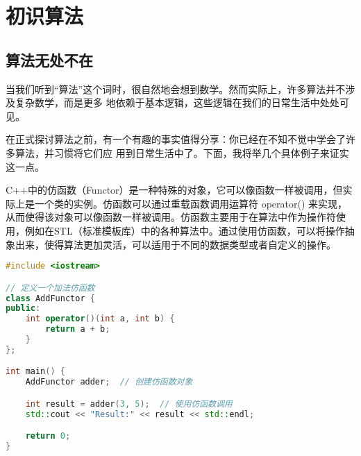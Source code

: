 
\pagestyle{fancy}
\rhead{}
\lhead{}
\lfoot{}
\cfoot{-\ \thepage \  -}
\rfoot{}
\section{初识算法}
\subsection{ 算法无处不在}
当我们听到“算法”这个词时，很自然地会想到数学。然而实际上，许多算法并不涉及复杂数学，而是更多
地依赖于基本逻辑，这些逻辑在我们的日常生活中处处可见。
\par 在正式探讨算法之前，有一个有趣的事实值得分享：你已经在不知不觉中学会了许多算法，并习惯将它们应
用到日常生活中了。下面，我将举几个具体例子来证实这一点。
\begin{formal}
C++中的仿函数（Functor）是一种特殊的对象，它可以像函数一样被调用，但实际上是一个类的实例。仿函数可以通过重载函数调用运算符 operator() 来实现，从而使得该对象可以像函数一样被调用。仿函数主要用于在算法中作为操作符使用，例如在STL（标准模板库）中的各种算法中。通过使用仿函数，可以将操作抽象出来，使得算法更加灵活，可以适用于不同的数据类型或者自定义的操作。
\end{formal}
\begin{lstlisting}[language=C++, label=lst:cpp]
#include <iostream>

// 定义一个加法仿函数
class AddFunctor {
public:
    int operator()(int a, int b) {
        return a + b;
    }
};

int main() {
    AddFunctor adder;  // 创建仿函数对象

    int result = adder(3, 5);  // 使用仿函数调用
    std::cout << "Result:" << result << std::endl;

    return 0;
}
\end{lstlisting}